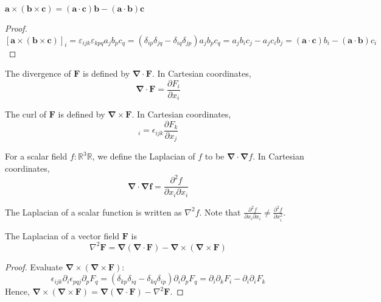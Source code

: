 \documentclass[a4paper]{article}
\begin{document}
\begin{thm}
$\mathbf{a\times (b\times c) = (a\cdot c)b - (a\cdot b)c}$
\end{thm}
\begin{proof}
$\mathbf{[a\times(b\times c)]}_i =  \varepsilon_{ijk}\varepsilon_{kpq}a_jb_pc_q= (\delta_{ip}\delta_{jq}-\delta_{iq}\delta_{jp})a_jb_pc_q= a_jb_ic_j - a_jc_ib_j= \mathbf{(a\cdot c)}b_i - \mathbf{(a\cdot b)}c_i$
\end{proof}
\begin{defi}[Divergence]
The divergence of $\mathbf{F}$ is defined by $\boldsymbol{\nabla}\cdot\mathbf{F}$. In Cartesian coordinates,
\begin{equation}
    \boldsymbol{\nabla}\cdot\mathbf{F}=\frac{\partial F_i}{\partial x_i}\tag{1.7}
\end{equation}
\end{defi}
\begin{defi}[Curl]
The curl of $\mathbf{F}$ is defined by $\boldsymbol{\nabla}\times\mathbf{F}$. In Cartesian coordinates,
\begin{equation}
    [\boldsymbol{\nabla}\times\mathbf{F}]_i=\epsilon_{ijk}\frac{\partial F_k}{\partial x_j}\tag{1.8}
\end{equation}
\end{defi}
\begin{defi}[Laplacian]
For a scalar field $f:\mathbb{R}^3\mathbb{R}$, we define the Laplacian of $f$ to be $\boldsymbol{\nabla}\cdot\boldsymbol{\nabla}f$. In Cartesian coordinates,
\begin{equation}
    \boldsymbol{\nabla}\cdot\boldsymbol{\nabla f}=\frac{\partial^2f}{\partial x_i\partial x_i}\tag{1.9}
\end{equation}
\end{defi}
\begin{notation}
The Laplacian of a scalar function is written as $\nabla^2f$. Note that $\frac{\partial^2f}{\partial x_i\partial x_i}\neq\frac{\partial^2f}{\partial x_i^2}$.
\end{notation}
\begin{prop}
The Laplacian of a vector field $\mathbf{F}$ is
\begin{equation}
    \nabla^2\mathbf{F}=\boldsymbol{\nabla}(\boldsymbol{\nabla}\cdot\mathbf{F})-\boldsymbol{\nabla}\times(\boldsymbol{\nabla}\times\mathbf{F})\tag{1.10}
\end{equation}
\end{prop}
\begin{proof}
Evaluate $\boldsymbol{\nabla}\times(\boldsymbol{\nabla}\times\mathbf{F})$:
$$\epsilon_{ijk}\partial_i\epsilon_{pqj}\partial_pF_q=(\delta_{kp}\delta_{iq}-\delta_{kq}\delta_{ip})\partial_i\partial_pF_q=\partial_i\partial_kF_i-\partial_i\partial_iF_k$$
Hence, $\boldsymbol{\nabla}\times(\boldsymbol{\nabla}\times\mathbf{F})=\boldsymbol{\nabla}(\boldsymbol{\nabla}\cdot\mathbf{F})-\nabla^2\mathbf{F}$.
\end{proof}
\end{document}
